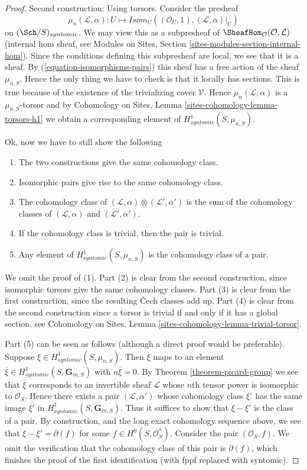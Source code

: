 \begin{proof}
\medskip\noindent
Second construction: Using torsors. Consider the presheaf
$$
\mu_n(\mathcal{L}, \alpha) :
U
\longmapsto
\mathit{Isom}_U((\mathcal{O}_U, 1), (\mathcal{L}, \alpha)|_U)
$$
on $(\Sch/S)_{syntomic}$.
We may view this as a subpresheaf of
$\SheafHom_\mathcal{O}(\mathcal{O}, \mathcal{L})$ (internal hom
sheaf, see
Modules on Sites, Section \ref{sites-modules-section-internal-hom}).
Since the conditions defining this subpresheaf are local, we see that it is
a sheaf.
By (\ref{equation-isomorphisms-pairs}) this sheaf has a free action of
the sheaf $\mu_{n, S}$. Hence the only thing we have to check is that
it locally has sections. This is true because of the existence of the
trivializing cover $\mathcal{V}$. Hence $\mu_n(\mathcal{L}, \alpha)$
is a $\mu_{n, S}$-torsor and by
Cohomology on Sites, Lemma \ref{sites-cohomology-lemma-torsors-h1}
we obtain a corresponding element of $H^1_{syntomic}(S, \mu_{n, S})$.

\medskip\noindent
Ok, now we have to still show the following
\begin{enumerate}
\item The two constructions give the same cohomology class.
\item Isomorphic pairs give rise to the same cohomology class.
\item The cohomology class of
$(\mathcal{L}, \alpha) \otimes (\mathcal{L}', \alpha')$
is the sum of the cohomology classes of
$(\mathcal{L}, \alpha)$ and $(\mathcal{L}', \alpha')$.
\item If the cohomology class is trivial, then the pair is trivial.
\item Any element of $H^1_{syntomic}(S, \mu_{n, S})$ is the
cohomology class of a pair.
\end{enumerate}
We omit the proof of (1). Part (2) is clear from the second construction,
since isomorphic torsors give the same cohomology classes.
Part (3) is clear from the first construction, since the resulting
{\v C}ech classes add up. Part (4) is clear from the second construction
since a torsor is trivial if and only if it has a global section, see
Cohomology on Sites, Lemma \ref{sites-cohomology-lemma-trivial-torsor}.

\medskip\noindent
Part (5) can be seen as follows (although a direct proof would be
preferable). Suppose $\xi \in H^1_{syntomic}(S, \mu_{n, S})$.
Then $\xi$ maps to an element
$\overline{\xi} \in H^1_{syntomic}(S, \mathbf{G}_{m, S})$
with $n \overline{\xi} = 0$. By
Theorem \ref{theorem-picard-group}
we see that $\overline{\xi}$ corresponds to an invertible sheaf $\mathcal{L}$
whose $n$th tensor power is isomorphic to $\mathcal{O}_S$.
Hence there exists a pair $(\mathcal{L}, \alpha')$ whose cohomology
class $\xi'$ has the same image $\overline{\xi'}$ in
$H^1_{syntomic}(S, \mathbf{G}_{m, S})$. Thus it suffices to show
that $\xi - \xi'$ is the class of a pair. By construction, and the
long exact cohomology sequence above, we see that
$\xi - \xi' = \partial(f)$ for some $f \in H^0(S, \mathcal{O}_S^*)$.
Consider the pair $(\mathcal{O}_S, f)$. We omit the verification
that the cohomology class of this pair is $\partial(f)$, which
finishes the proof of the first identification (with fppf replaced
with syntomic).


\end{proof}
